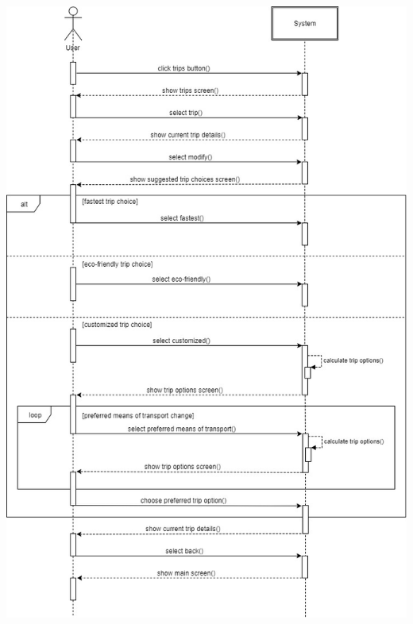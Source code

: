 \begin{center}
\includegraphics[scale=0.516]{MainMatter/images/sequencediagrams/managetrip}
\end{center}

